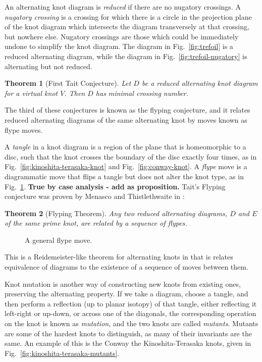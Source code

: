 \documentclass[12pt]{report}
\newcommand{\notered}[1]{{\color{Red} \textbf{#1}}}
\newtheorem*{theorem}{Theorem}
\theoremstyle{upright}
\begin{document}
An alternating knot diagram is \textit{reduced} if there are no nugatory crossings. A \textit{nugatory crossing} is a crossing for which there is a circle in the projection plane of the knot diagram which intersects the diagram transversely at that crossing, but nowhere else. Nugatory crossings are those which could be immediately undone to simplify the knot diagram. The diagram in Fig.~\ref{fig:trefoil} is a reduced alternating diagram, while the diagram in Fig.~\ref{fig:trefoil-nugatory} is alternating but not reduced.

\begin{theorem}[First Tait Conjecture]
Let $D$ be a reduced alternating knot diagram for a virtual knot $V$. Then $D$ has minimal crossing number.
\end{theorem}

The third of these conjectures is known as the flyping conjecture, and it relates reduced alternating diagrams of the same alternating knot by moves known as flype moves.

A \textit{tangle} in a knot diagram is a region of the plane that is homeomorphic to a disc, such that the knot crosses the boundary of the disc exactly four times, as in Fig.~\ref{fig:kinoshita-terasaka-knot} and Fig.~\ref{fig:conway-knot}. A \textit{flype} move is a diagrammatic move that flips a tangle but does not alter the knot type, as in Fig.~\ref{fig:flype}. \notered{True by case analysis - add as proposition.} Tait's Flyping conjecture was proven by Menasco and Thistlethwaite in \cite[p. 166]{classification-alternating-links}:

\begin{theorem}[Flyping Theorem]
Any two reduced alternating diagrams, $D$ and $E$ of the same prime knot, are related by a sequence of flypes.
\end{theorem}

\begin{figure}[hbt]
	\centering
	\def\svgscale{0.5}
	
	\caption{A general flype move.}
	\label{fig:flype}
\end{figure}

This is a Reidemeister-like theorem for alternating knots in that is relates equivalence of diagrams to the existence of a sequence of moves between them.

Knot mutation is another way of constructing new knots from existing ones, preserving the alternating property. If we take a diagram, choose a tangle, and then perform a reflection (up to planar isotopy) of that tangle, either reflecting it left-right or up-down, or across one of the diagonals, the corresponding operation on the knot is known as \textit{mutation}, and the two knots are called \textit{mutants}. Mutants are some of the hardest knots to distinguish, as many of their invariants are the same. An example of this is the Conway the Kinoshita-Terasaka knots, given in Fig.~\ref{fig:kinoshita-terasaka-mutants}.
\end{document}
